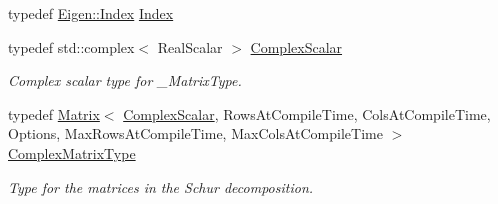 \begin{DoxyCompactItemize}
\item 
typedef \hyperlink{namespace_eigen_a62e77e0933482dafde8fe197d9a2cfde}{Eigen\+::\+Index} \hyperlink{group___eigenvalues___module_a652104d13723a5b1db2937866a034557}{Index}
\item 
typedef std\+::complex$<$ Real\+Scalar $>$ \hyperlink{group___eigenvalues___module_ae1a4713b53f821867fbad617e426832a}{Complex\+Scalar}
\begin{DoxyCompactList}\small\item\em Complex scalar type for {\ttfamily \+\_\+\+Matrix\+Type}. \end{DoxyCompactList}\item 
typedef \hyperlink{group___core___module_class_eigen_1_1_matrix}{Matrix}$<$ \hyperlink{group___eigenvalues___module_ae1a4713b53f821867fbad617e426832a}{Complex\+Scalar}, Rows\+At\+Compile\+Time, Cols\+At\+Compile\+Time, Options, Max\+Rows\+At\+Compile\+Time, Max\+Cols\+At\+Compile\+Time $>$ \hyperlink{group___eigenvalues___module_af61fe57877d51cfb50178f78534042f0}{Complex\+Matrix\+Type}
\begin{DoxyCompactList}\small\item\em Type for the matrices in the Schur decomposition. \end{DoxyCompactList}\end{DoxyCompactItemize}

